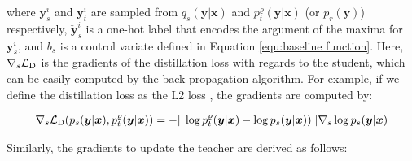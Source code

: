 \documentclass{article}
\newcommand{\OVEC}[1]{\bm{#1}} %
\newcommand{\SVEC}[1]{\check{\bm{#1}}}
\newcommand{\DTN}{\mathcal{L}_{\rm{D}}}
\newcommand{\abbrpstd}{p_{s}}
\newcommand{\fullpstd}[1]{p_{s}(#1|\OVEC{x})}
\newcommand{\fullqstd}[1]{q_{s}(#1|\OVEC{x})}
\newcommand{\abbrptch}{p_{t}^{\varrho}}
\newcommand{\fullptch}[1]{p_{t}^{\varrho}(#1|\OVEC{x})}
\newcommand{\fullpcls}{p_{r}(\OVEC{y})}
\begin{document}
where $\OVEC{y}^{i}_{s}$ and $\OVEC{y}^{i}_{t}$ are sampled from $\fullqstd{\OVEC{y}}$ and $\fullptch{\OVEC{y}}$ (or $\fullpcls$) respectively, $\SVEC{y}^{i}_{s}$ is a one-hot label that encodes the argument of the maxima for $\OVEC{y}^{i}_{s}$, and $b_{s}$ is a control variate defined in Equation \ref{equ:baseline function}.
Here, $\nabla_{s}\DTN$ is the gradients of the distillation loss with regards to the student, which can be easily computed by the back-propagation algorithm.
For example, if we define the distillation loss as the L2 loss \cite{ba2014deep}, the gradients are computed by:
\begin{small}
\begin{equation*}
\begin{aligned}
\nabla_{s}
\DTN(\fullpstd{\OVEC{y}},\fullptch{\OVEC{y}})
=
-
||\log\fullptch{\OVEC{y}}-\log\fullpstd{\OVEC{y}})||
\nabla_{s}\log\fullpstd{\OVEC{y}}
\\
\end{aligned}
\end{equation*}
\end{small}%
Similarly, the gradients to update the teacher are derived as follows:
\end{document}
